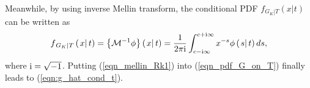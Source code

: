 \documentclass[12pt,onecolumn,draftcls]{IEEEtran}
\newcommand{\bs}{\boldsymbol}
\begin{document}
Meanwhile, by using inverse Mellin transform, the conditional PDF $f_{\left. G_K \right|T}(x|t)$ can be written as \cite{debnath2010integral}
\begin{equation}\label{eqn_pdf_G_on_T}
{f_{\left. G_K \right|T}}\left( {\left. x \right|t} \right) = \left\{ {{\mathcal M^{ - 1}}\phi } \right\}\left( \left. x \right| t\right) = \frac{1}{{2\pi \rm i}}\int\nolimits_{c - {\rm i}\infty }^{c + {\rm i}\infty } {{x^{ - s}}} \phi \left( {\left. s \right|t} \right)ds,
\end{equation}
where ${\rm i} = \sqrt{-1}$. Putting (\ref{eqn_mellin_Rk1}) into (\ref{eqn_pdf_G_on_T}) finally leads to (\ref{eqn:g_hat_cond_t}).




\end{document}

